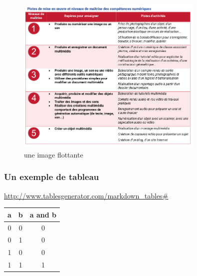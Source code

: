 \documentclass[
  11pt,
]{article}
\begin{document}
\begin{figure}
\centering
\includegraphics[width=0.8\textwidth,height=\textheight]{image.png}
\caption{une image flottante}
\end{figure}

\hypertarget{un-exemple-de-tableau}{%
\subsubsection{Un exemple de tableau}\label{un-exemple-de-tableau}}

\url{http://www.tablesgenerator.com/markdown_tables\#}

\begin{longtable}[]{@{}ccc@{}}
\toprule
a & b & a and b\tabularnewline
\midrule
\endhead
0 & 0 & 0\tabularnewline
0 & 1 & 0\tabularnewline
1 & 0 & 0\tabularnewline
1 & 1 & 1\tabularnewline
\bottomrule
\end{longtable}
\end{document}
